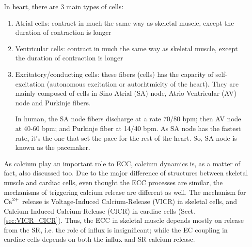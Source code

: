
In heart, there are 3 main types of cells:
\begin{enumerate}
  \item Atrial cells: contract in much the same way as skeletal muscle, except
  the duration of contraction is longer
  \item Ventricular cells: contract in much the same way as skeletal muscle, except
  the duration of contraction is longer
  \item Excitatory/conducting cells: these fibers (cells) has the capacity of
  self-excitation (autonomous excitation or autorhtmicity of the heart). They
  are mainly composed of cells in Sino-Atrial (SA) node, Atrio-Ventricular (AV)
  node and Purkinje fibers. 
  
  In human, the SA node fibers discharge at a rate 70/80 bpm; then AV node at
  40-60 bpm; and Purkinje fiber at 14/40 bpm. As SA node has the fastest rate,
  it's the one that set the pace for the rest of the heart. So, SA node is known
  as the pacemaker. 
  
\end{enumerate}


As calcium play an important role to ECC, calcium dynamics is, as a matter of
fact, also discussed too. Due to the major difference of structures between
skeletal muscle and cardiac cells, even thought the ECC processes are similar,
the mechanisms of triggering calcium release are different as well.  The
mechanism for ${\text{Ca}^{2+}}$ release is Voltage-Induced Calcium-Release (VICR) in
skeletal cells, and Calcium-Induced Calcium-Release (CICR) in cardiac cells
(Sect.\ref{sec:VICR_CICR}). Thus, the ECC in skeletal muscle depends mostly on
 release  from the SR, i.e. the role of influx  is
insignificant; while the EC coupling in cardiac cells depends on both the
 influx and SR calcium release. 

